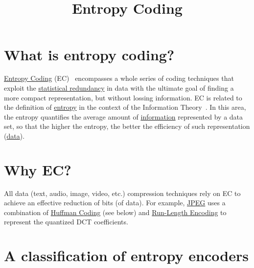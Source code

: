 



\title{Entropy Coding}

\maketitle

\tableofcontents

\section{What is entropy coding?}

\href{https://en.wikipedia.org/wiki/Entropy_coding}{Entropy Coding}
(EC)~\cite{vruiz__entropy_coding} encompasses a whole series of coding
techniques that exploit the
\href{https://en.wikipedia.org/wiki/Redundancy_(information_theory)}{statistical
  redundancy} in data with the ultimate goal of finding a more compact
representation, but without lossing information. EC is related to the definition of
\href{https://en.wikipedia.org/wiki/Entropy_(information_theory)}{entropy}
in the context of the Information
Theory~\cite{vruiz__information_theory}. In this area, the entropy
quantifies the average amount of
\href{https://en.wikipedia.org/wiki/Information}{information}
represented by a data set, so that the higher the entropy, the better
the efficiency of such representation
(\href{https://en.wikipedia.org/wiki/Data}{data}).

\section{Why EC?}
All data (text, audio, image, video, etc.) compression techniques rely
on EC to achieve an effective reduction of bits (of data). For example,
\href{https://en.wikipedia.org/wiki/JPEG}{JPEG} uses a combination of
\href{https://en.wikipedia.org/wiki/Huffman_coding}{Huffman Coding}
(see below) and
\href{https://en.wikipedia.org/wiki/Run-length_encoding}{Run-Length
  Encoding} to represent the quantized DCT coefficients.

\section{A classification of entropy encoders}

